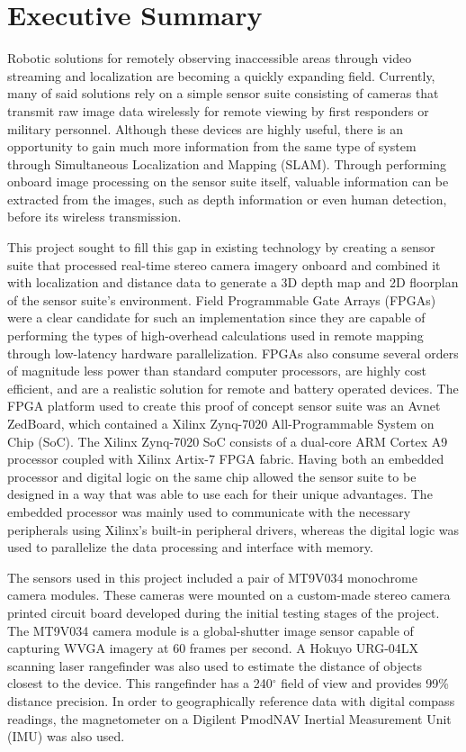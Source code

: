 {}
\section*{Executive Summary}
Robotic solutions for remotely observing inaccessible areas through video streaming and localization are becoming a quickly expanding field. Currently, many of said solutions rely on a simple sensor suite consisting of cameras that transmit raw image data wirelessly for remote viewing by first responders or military personnel. Although these devices are highly useful, there is an opportunity to gain much more information from the same type of system through Simultaneous Localization and Mapping (SLAM). Through performing onboard image processing on the sensor suite itself, valuable information can be extracted from the images, such as depth information or even human detection, before its wireless transmission.
\par
This project sought to fill this gap in existing technology by creating a sensor suite that processed real-time stereo camera imagery onboard and combined it with localization and distance data to generate a 3D depth map and 2D floorplan of the sensor suite's environment. Field Programmable Gate Arrays (FPGAs) were a clear candidate for such an implementation since they are capable of performing the types of high-overhead calculations used in remote mapping through low-latency hardware parallelization. FPGAs also consume several orders of magnitude less power than standard computer processors, are highly cost efficient, and are a realistic solution for remote and battery operated devices. The FPGA platform used to create this proof of concept sensor suite was an Avnet ZedBoard, which contained a Xilinx Zynq-7020 All-Programmable System on Chip (SoC). The Xilinx Zynq-7020 SoC consists of a dual-core ARM Cortex A9 processor coupled with Xilinx Artix-7 FPGA fabric. Having both an embedded processor and digital logic on the same chip allowed the sensor suite to be designed in a way that was able to use each for their unique advantages. The embedded processor was mainly used to communicate with the necessary peripherals using Xilinx's built-in peripheral drivers, whereas the digital logic was used to parallelize the data processing and interface with memory.
\par
The sensors used in this project included a pair of MT9V034 monochrome camera modules. These cameras were mounted on a custom-made stereo camera printed circuit board developed during the initial testing stages of the project. The MT9V034 camera module is a global-shutter image sensor capable of capturing WVGA imagery at 60 frames per second. A Hokuyo URG-04LX scanning laser rangefinder was also used to estimate the distance of objects closest to the device. This rangefinder has a 240$^\circ$ field of view and provides 99\% distance precision. In order to geographically reference data with digital compass readings, the magnetometer on a Digilent PmodNAV Inertial Measurement Unit (IMU) was also used. 
